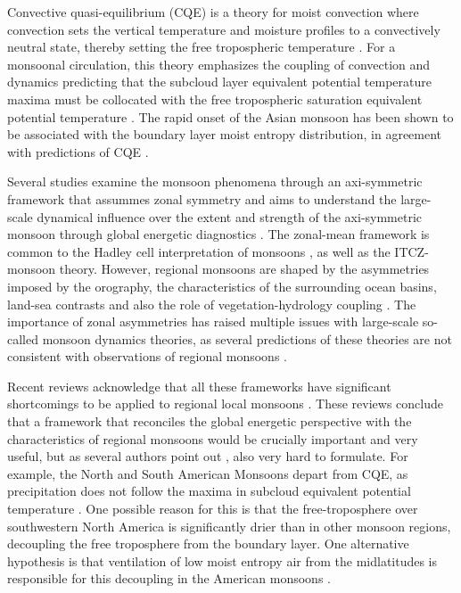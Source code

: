 Convective quasi-equilibrium (CQE) is a theory for moist convection where convection sets the vertical temperature and moisture profiles to a convectively neutral state, thereby setting the free tropospheric temperature \citep{neelin2007moist}. For a monsoonal circulation, this theory emphasizes the coupling of convection and dynamics predicting that the subcloud layer equivalent potential temperature maxima must be collocated with the free tropospheric saturation equivalent potential temperature \citep{nie2010observational,geen2020}. The rapid onset of the Asian monsoon has been shown to be associated with the boundary layer moist entropy distribution, in agreement with predictions of CQE \citep{nie2010observational,boos2015review,ma2019}.

Several studies examine the monsoon phenomena through an axi-symmetric framework that assummes zonal symmetry and aims to understand the large-scale dynamical influence over the extent and strength of the axi-symmetric monsoon through global energetic diagnostics \citep[e.g.][]{faulk2017effects,geen2019,byrne2020}. The zonal-mean framework is common to the Hadley cell interpretation of monsoons \citep{bordoni2008monsoons}, as well as the ITCZ-monsoon theory. %
However, regional monsoons are shaped by the asymmetries imposed by the orography, the characteristics of the surrounding ocean basins, land-sea contrasts and also the role of vegetation-hydrology coupling \citep{wang2017,pascale2019}. 
The importance of zonal asymmetries has raised multiple issues with large-scale so-called monsoon dynamics theories, as several predictions of these theories are not consistent with observations of regional monsoons \citep[e.g.][]{nie2010observational,smyth2018simulated,biasutti2018global,pascale2019}. 


Recent reviews acknowledge that all these frameworks have significant shortcomings to be applied to regional local monsoons \citep{biasutti2018global,hill2019,geen2020}. These reviews conclude that a framework that reconciles the global energetic perspective with the characteristics of regional monsoons would be crucially important and very useful, but as several authors point out \citep[e.g.][]{biasutti2018global,hill2019}, also very hard to formulate. For example, the North and South American Monsoons depart from CQE, as precipitation does not follow the maxima in subcloud equivalent potential temperature \citep{nie2010observational,geen2020}. One possible reason for this is that the free-troposphere over southwestern North America is significantly drier than in other monsoon regions, decoupling the free troposphere from the boundary layer. One alternative hypothesis is that ventilation of low moist entropy air from the midlatitudes is responsible for this decoupling in the American monsoons \citep{boos2015review}.

